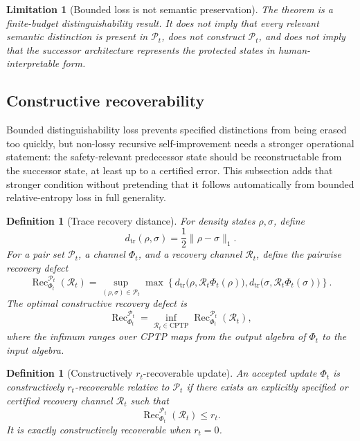 \documentclass[11pt]{article}
\newtheorem{definition}[theorem]{Definition}
\newtheorem{limitation}[theorem]{Limitation}
\newcommand{\Pcal}{\mathcal{P}}
\newcommand{\Rcal}{\mathcal{R}}
\newcommand{\1}{\mathbf{1}}
\providecommand{\CPTP}{\mathrm{CPTP}}
\providecommand{\Rec}{\operatorname{Rec}}
\begin{document}
\begin{limitation}[Bounded loss is not semantic preservation]
The theorem is a finite-budget distinguishability result.  It does not imply that every relevant semantic distinction is present in \(\Pcal_t\), does not construct \(\Pcal_t\), and does not imply that the successor architecture represents the protected states in human-interpretable form.
\end{limitation}

\subsection{Constructive recoverability}
\label{subsec:constructive_recovery}

Bounded distinguishability loss prevents specified distinctions from being erased too quickly, but non-lossy recursive self-improvement needs a stronger operational statement: the safety-relevant predecessor state should be reconstructable from the successor state, at least up to a certified error.  This subsection adds that stronger condition without pretending that it follows automatically from bounded relative-entropy loss in full generality.

\begin{definition}[Trace recovery distance]
For density states \(\rho,\sigma\), define
\[
d_{\mathrm{tr}}(\rho,\sigma)
=
\frac12\|\rho-\sigma\|_1.
\]
For a pair set \(\Pcal_t\), a channel \(\Phi_t\), and a recovery channel \(\Rcal_t\), define the pairwise recovery defect
\[
\Rec^{\Pcal_t}_{\Phi_t}(\Rcal_t)
=
\sup_{(\rho,\sigma)\in\Pcal_t}
\max\left\{
 d_{\mathrm{tr}}\bigl(\rho,\Rcal_t\Phi_t(\rho)\bigr),
 d_{\mathrm{tr}}\bigl(\sigma,\Rcal_t\Phi_t(\sigma)\bigr)
\right\}.
\]
The optimal constructive recovery defect is
\[
\Rec^{\Pcal_t}_{\Phi_t}
=
\inf_{\Rcal_t\in\CPTP}
\Rec^{\Pcal_t}_{\Phi_t}(\Rcal_t),
\]
where the infimum ranges over CPTP maps from the output algebra of \(\Phi_t\) to the input algebra.
\end{definition}

\begin{definition}[Constructively \(r_t\)-recoverable update]
An accepted update \(\Phi_t\) is constructively \(r_t\)-recoverable relative to \(\Pcal_t\) if there exists an explicitly specified or certified recovery channel \(\Rcal_t\) such that
\[
\Rec^{\Pcal_t}_{\Phi_t}(\Rcal_t)\le r_t.
\]
It is exactly constructively recoverable when \(r_t=0\).
\end{definition}
\end{document}
